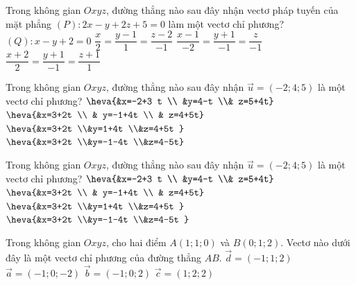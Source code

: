 \begin{ex}%
Trong không gian $Oxyz$, đường thẳng nào sau đây nhận vectơ pháp tuyến của mặt phẳng $(P) \colon 2x-y+2z+5=0$ làm một vectơ chỉ phương?
\choice
{$( Q) \colon x-y+2=0$}
{$\dfrac{x}{2}=\dfrac{y-1}{1}=\dfrac{z-2}{-1}$}
{\True $\dfrac{x-1}{-2}=\dfrac{y+1}{-1}=\dfrac{z}{-1}$}
{$\dfrac{x+2}{2}=\dfrac{y+1}{-1}=\dfrac{z+1}{1}$}
\end{ex}
\begin{ex}%
Trong không gian $Oxyz$, đường thẳng nào sau đây nhận ${\overrightarrow{u}=(-2 ; 4 ; 5)}$ là một vectơ chỉ phương?
\choice
{$\heva{&x=-2+3 t \\ &y=4-t \\& z=5+4t}$}
{$\heva{&x=3+2t \\ & y=-1+4t \\ & z=4+5t}$}
{$\heva{&x=3+2t  \\&y=1+4t  \\&z=4+5t }$}
{\True $\heva{&x=3+2t  \\&y=-1-4t  \\&z=4-5t}$}
\end{ex}
\begin{ex}%
	Trong không gian $Oxyz$, đường thẳng nào sau đây nhận $\overrightarrow{u}=(-2;4;5)$ là một vectơ chỉ phương?
	\choice
	{$\heva{&x=-2+3 t \\ &y=4-t \\& z=5+4t}$}
	{$\heva{&x=3+2t \\ & y=-1+4t \\ & z=4+5t}$}
	{$\heva{&x=3+2t  \\&y=1+4t  \\&z=4+5t }$}
	{\True $\heva{&x=3+2t  \\&y=-1-4t  \\&z=4-5t }$}
\end{ex}
\begin{ex}%
Trong không gian $Oxyz$, cho hai điểm $A(1;1;0)$ và $B( 0;1;2 )$. Vectơ nào dưới đây là một vectơ chỉ phương của đường thẳng $AB$.
		\choice
		{ $\overrightarrow{d}=(-1;1;2)$}
		{ $\overrightarrow{a}=(-1;0;-2)$}
		{\True $\overrightarrow{b}=(-1;0;2)$}
		{ $\overrightarrow{c}=( 1;2;2)$}
\end{ex}
